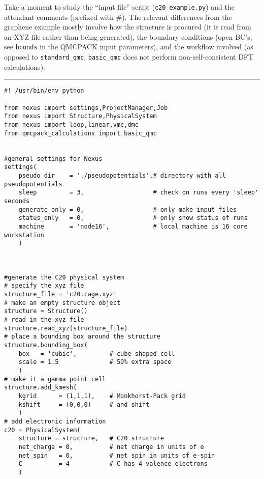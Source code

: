 \documentclass[oneside,11pt]{memoir}
\numberwithin{equation}{section}
\newcommand{\HRule}{\rule{\linewidth}{0.5mm}}
\begin{document}
Take a moment to study the ``input file'' script 
(\texttt{c20\_example.py}) and the attendant comments 
(prefixed with \#). The relevant differences from the graphene example
mostly involve how the structure is procured (it is read from an XYZ file
rather than being generated), the boundary conditions (open BC's, see 
\texttt{bconds} in the QMCPACK input parameters), and the workflow involved 
(as opposed to \texttt{standard\_qmc}, \texttt{basic\_qmc} does not perform 
non-self-consistent DFT calculations).


\HRule
\begin{verbatim}
#! /usr/bin/env python

from nexus import settings,ProjectManager,Job
from nexus import Structure,PhysicalSystem
from nexus import loop,linear,vmc,dmc
from qmcpack_calculations import basic_qmc


#general settings for Nexus
settings(
    pseudo_dir    = './pseudopotentials',# directory with all pseudopotentials
    sleep         = 3,                   # check on runs every 'sleep' seconds
    generate_only = 0,                   # only make input files
    status_only   = 0,                   # only show status of runs
    machine       = 'node16',            # local machine is 16 core workstation
    )



#generate the C20 physical system
# specify the xyz file
structure_file = 'c20.cage.xyz'
# make an empty structure object
structure = Structure()
# read in the xyz file
structure.read_xyz(structure_file)
# place a bounding box around the structure
structure.bounding_box(
    box   = 'cubic',         # cube shaped cell
    scale = 1.5              # 50% extra space
    )
# make it a gamma point cell
structure.add_kmesh(
    kgrid      = (1,1,1),    # Monkhorst-Pack grid
    kshift     = (0,0,0)     # and shift
    )
# add electronic information
c20 = PhysicalSystem(
    structure = structure,   # C20 structure
    net_charge = 0,          # net charge in units of e
    net_spin   = 0,          # net spin in units of e-spin
    C          = 4           # C has 4 valence electrons
    ) 



\end{verbatim}
\end{document}

